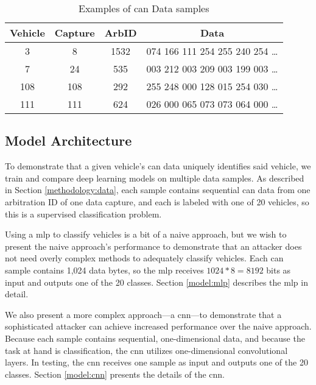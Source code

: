 \documentclass[../main.tex]{subfiles}
\begin{document}
\begin{table}
    \caption{Examples of \ac{can} Data samples}
    \centering
    \label{tab:samples}
    \begin{tabular}{|c|c|c|c|}
    \hline
    \textbf{Vehicle} & \textbf{Capture} & \textbf{ArbID} & \textbf{Data} \\
    \hline
    3   & 8   & 1532 & 074 166 111 254 255 240 254 \ldots \\
    7   & 24  & 535  & 003 212 003 209 003 199 003 \ldots \\
    108 & 108 & 292  & 255 248 000 128 015 254 030 \ldots \\
    111 & 111 & 624  & 026 000 065 073 073 064 000 \ldots \\
    \hline
    \end{tabular}
\end{table}

\subsection{Model Architecture}


To demonstrate that a given vehicle's \ac{can} data uniquely identifies said vehicle, we train and compare deep learning models on multiple data samples. As described in Section \ref{methodology:data}, each sample contains sequential \ac{can} data from one arbitration ID of one data capture, and each is labeled with one of 20 vehicles, so this is a supervised classification problem.


Using a \acl{mlp} to classify vehicles is a bit of a naive approach, but we wish to present the naive approach's performance to demonstrate that an attacker does not need overly complex methods to adequately classify vehicles. Each \ac{can} sample contains 1,024 data bytes, so the \ac{mlp} receives $1024 * 8 = 8192$ bits as input and outputs one of the 20 classes. Section \ref{model:mlp} describes the \ac{mlp} in detail.

We also present a more complex approach---a \acl{cnn}---to demonstrate that a sophisticated attacker can achieve increased performance over the naive approach. Because each sample contains sequential, one-dimensional data, and because the task at hand is classification, the \ac{cnn} utilizes one-dimensional convolutional layers. In testing, the \ac{cnn} receives one sample as input and outputs one of the 20 classes. Section \ref{model:cnn} presents the details of the \ac{cnn}.
\end{document}
